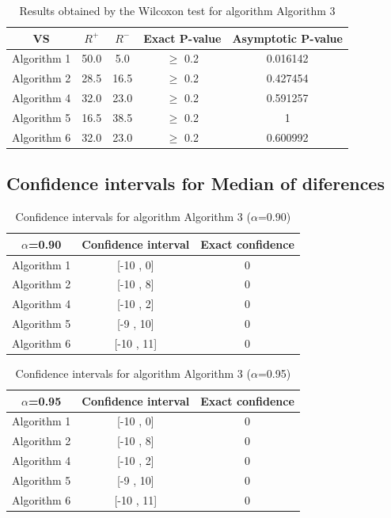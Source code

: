 \documentclass[a4paper,10pt]{article}
\begin{document}
\begin{table}[!htp]
\centering\small
\begin{tabular}{
|c|c|c|c|c|}
\hline
 VS & $R^{+}$ & $R^{-}$ & Exact P-value & Asymptotic P-value \\ \hline 
Algorithm 1 & 50.0 & 5.0 & $\geq$ 0.2 & 0.016142\\ \hline 
Algorithm 2 & 28.5 & 16.5 & $\geq$ 0.2 & 0.427454\\ \hline 
Algorithm 4 & 32.0 & 23.0 & $\geq$ 0.2 & 0.591257\\ \hline 
Algorithm 5 & 16.5 & 38.5 & $\geq$ 0.2 & 1\\ \hline 
Algorithm 6 & 32.0 & 23.0 & $\geq$ 0.2 & 0.600992\\ \hline 

\end{tabular}
\caption{Results obtained by the Wilcoxon test for algorithm Algorithm 3}
\end{table}

\subsection{Confidence intervals for Median of diferences}

\begin{table}[!htp]
\centering\small
\begin{tabular}{
|c|c|c|}
\hline
 $\alpha$=0.90 & Confidence interval & Exact confidence \\ \hline 
Algorithm 1 & [-10 , 0] & 0\\ \hline 
Algorithm 2 & [-10 , 8] & 0\\ \hline 
Algorithm 4 & [-10 , 2] & 0\\ \hline 
Algorithm 5 & [-9 , 10] & 0\\ \hline 
Algorithm 6 & [-10 , 11] & 0\\ \hline 

\end{tabular}
\caption{Confidence intervals for algorithm Algorithm 3 ($\alpha$=0.90)}
\end{table}
\begin{table}[!htp]
\centering\small
\begin{tabular}{
|c|c|c|}
\hline
 $\alpha$=0.95 & Confidence interval & Exact confidence \\ \hline 
Algorithm 1 & [-10 , 0] & 0\\ \hline 
Algorithm 2 & [-10 , 8] & 0\\ \hline 
Algorithm 4 & [-10 , 2] & 0\\ \hline 
Algorithm 5 & [-9 , 10] & 0\\ \hline 
Algorithm 6 & [-10 , 11] & 0\\ \hline 

\end{tabular}
\caption{Confidence intervals for algorithm Algorithm 3 ($\alpha$=0.95)}
\end{table}
\end{document}

